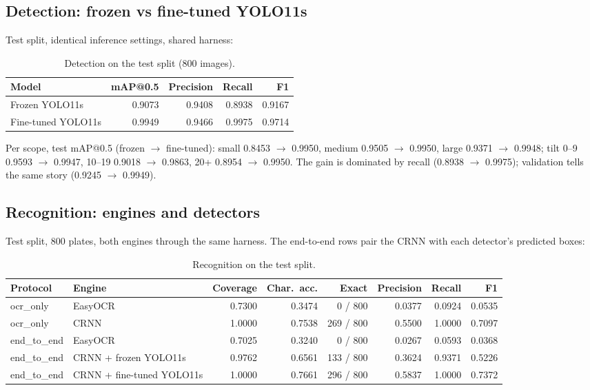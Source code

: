 \documentclass[11pt]{article}
\begin{document}
\subsection{Detection: frozen vs fine-tuned YOLO11s}

Test split, identical inference settings, shared harness:

\begin{table}[H]
\centering
\begin{tabular}{@{}lrrrr@{}}
\toprule
Model & mAP@0.5 & Precision & Recall & F1 \\
\midrule
Frozen YOLO11s & 0.9073 & 0.9408 & 0.8938 & 0.9167 \\
Fine-tuned YOLO11s & 0.9949 & 0.9466 & 0.9975 & 0.9714 \\
\bottomrule
\end{tabular}
\caption{Detection on the test split (800 images).}
\end{table}

Per scope, test mAP@0.5 (frozen $\rightarrow$ fine-tuned): small
0.8453 $\rightarrow$ 0.9950, medium 0.9505 $\rightarrow$ 0.9950, large
0.9371 $\rightarrow$ 0.9948; tilt 0--9 0.9593 $\rightarrow$ 0.9947, 10--19
0.9018 $\rightarrow$ 0.9863, 20+ 0.8954 $\rightarrow$ 0.9950. The gain is
dominated by recall (0.8938 $\rightarrow$ 0.9975); validation tells the same
story (0.9245 $\rightarrow$ 0.9949).

\subsection{Recognition: engines and detectors}

Test split, 800 plates, both engines through the same harness. The
end-to-end rows pair the CRNN with each detector's predicted boxes:

\begin{table}[H]
\centering
\small
\setlength{\tabcolsep}{4pt}
\begin{tabular}{@{}llrrrrrr@{}}
\toprule
Protocol & Engine & Coverage & Char.\ acc. & Exact & Precision & Recall & F1 \\
\midrule
ocr\_only & EasyOCR & 0.7300 & 0.3474 & 0 / 800 & 0.0377 & 0.0924 & 0.0535 \\
ocr\_only & CRNN & 1.0000 & 0.7538 & 269 / 800 & 0.5500 & 1.0000 & 0.7097 \\
end\_to\_end & EasyOCR & 0.7025 & 0.3240 & 0 / 800 & 0.0267 & 0.0593 & 0.0368 \\
end\_to\_end & CRNN + frozen YOLO11s & 0.9762 & 0.6561 & 133 / 800 & 0.3624 & 0.9371 & 0.5226 \\
end\_to\_end & CRNN + fine-tuned YOLO11s & 1.0000 & 0.7661 & 296 / 800 & 0.5837 & 1.0000 & 0.7372 \\
\bottomrule
\end{tabular}
\caption{Recognition on the test split.}
\end{table}
\end{document}
